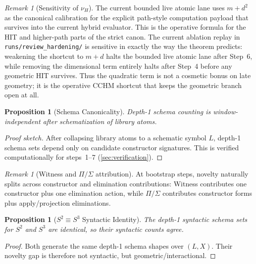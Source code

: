 \documentclass[11pt,a4paper]{article}
\theoremstyle{plain}
\newtheorem{proposition}[theorem]{Proposition}
\theoremstyle{definition}
\theoremstyle{remark}
\newtheorem{remark}[theorem]{Remark}
\begin{document}
\begin{remark}[Sensitivity of $\nu_H$]
\label{rem:nuH-sensitivity}
The current bounded live atomic lane uses $m+d^2$ as the canonical calibration for the explicit path-style computation payload that survives into the current hybrid evaluator.
This is the operative formula for the HIT and higher-path parts of the strict canon.
The current ablation replay in \texttt{runs/review\_hardening/} is sensitive in exactly the way the theorem predicts: weakening the shortcut to $m+d$ halts the bounded live atomic lane after Step~6, while removing the dimensional term entirely halts after Step~4 before any geometric HIT survives.
Thus the quadratic term is not a cosmetic bonus on late geometry; it is the operative CCHM shortcut that keeps the geometric branch open at all.
\end{remark}

\begin{proposition}[Schema Canonicality]
\label{prop:grammar-canonical}
Depth-1 schema counting is window-independent after schematization of library atoms.
\end{proposition}

\begin{proof}[Proof sketch]
After collapsing library atoms to a schematic symbol $L$, depth-1 schema sets depend only on candidate constructor signatures.
This is verified computationally for steps~1--7 (\cref{sec:verification}).
\end{proof}

\begin{remark}[Witness and $\Pi/\Sigma$ attribution]
\label{rem:witness-pisigma-attribution}
At bootstrap steps, novelty naturally splits across constructor and elimination contributions:
Witness contributes one constructor plus one elimination action, while $\Pi/\Sigma$ contributes constructor forms plus apply/projection eliminations.
\end{remark}

\begin{proposition}[$S^2 \equiv S^3$ Syntactic Identity]
\label{prop:s2s3}
The depth-1 syntactic schema sets for $S^2$ and $S^3$ are identical, so their syntactic counts agree.
\end{proposition}

\begin{proof}
Both generate the same depth-1 schema shapes over $(L,X)$.
Their novelty gap is therefore not syntactic, but geometric/interactional.
\end{proof}
\end{document}
